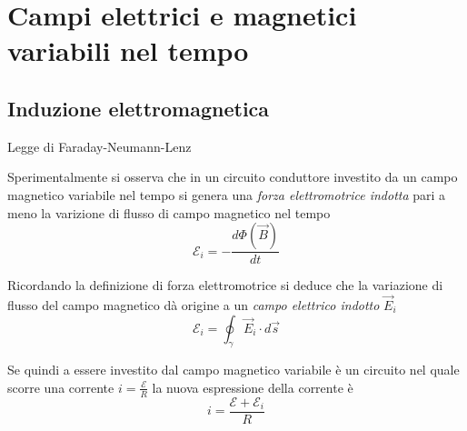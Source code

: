 \documentclass[x11names]{report}
\newcommand{\teorema}[2]{
	\begin{center}
		\fboxsep11pt
		\colorbox{myred}{\begin{minipage}{5.75in}
				\begin{redes}{#1}
					#2
				\end{redes}
		\end{minipage}}
	\end{center}
}
\begin{document}
\section{Campi elettrici e magnetici variabili nel tempo}
\subsection{Induzione elettromagnetica}
\teorema{Legge di Faraday-Neumann-Lenz}{
Sperimentalmente si osserva che in un circuito conduttore investito da un campo magnetico variabile nel tempo si genera una \textit{forza elettromotrice indotta} pari a meno la varizione di flusso di campo magnetico nel tempo
\begin{equation}
	\mathcal{E}_i = -\frac{d\Phi(\vec{B})}{dt}
\end{equation}}
Ricordando la definizione di forza elettromotrice si deduce che la variazione di flusso del campo magnetico dà origine a un \textit{campo elettrico indotto} \(\vec{E}_i\)
\[
\mathcal{E}_i = \oint_\gamma \vec{E}_i \cdot d\vec{s}
\]

Se quindi a essere investito dal campo magnetico variabile è un circuito nel quale scorre una corrente \(i = \frac{\mathcal{E}}{R}\) la nuova espressione della corrente è 
\[
i = \frac{\mathcal{E} + \mathcal{E}_i}{R}
\]
\end{document}
